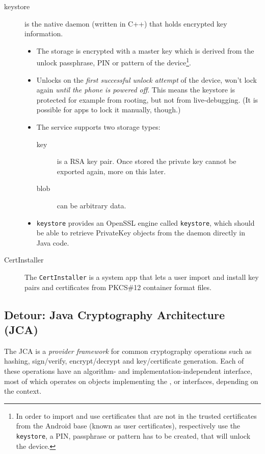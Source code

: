 \documentclass[a4paper]{scrartcl}
\begin{document}
\begin{description}
		\item[keystore] is the native daemon (written in C++) that holds encrypted key information.
			\begin{itemize}
				\item The storage is encrypted with a master key which is derived from the unlock passphrase, PIN or pattern of the device\footnote{In order to import and use certificates that are not in the trusted certificates from the Android base (known as user certificates), respectively use the \texttt{keystore}, a PIN, passphrase or pattern has to be created, that will unlock the device.}.
				\item Unlocks on the \emph{first successful unlock attempt} of the device, won't lock again \emph{until the phone is powered off}. This means the keystore is protected for example from rooting, but not from live-debugging. (It is possible for apps to lock it manually, though.)
				\item The service supports two storage types:
				\begin{description}
					\item[key] is a RSA key pair. Once stored the private key cannot be exported again, more on this later.
					\item[blob] can be arbitrary data.
				\end{description}
				\item \texttt{keystore} provides an OpenSSL engine called \texttt{keystore}, which should be able to retrieve PrivateKey objects from the daemon directly in Java code.
			\end{itemize}
		\item [CertInstaller] The \texttt{CertInstaller} is a system app that lets a user import and install key pairs and certificates from PKCS\#12 container format files. %
	\end{description}

	\subsection*{Detour: Java Cryptography Architecture (JCA)}
		The JCA is a {\em provider framework} for common cryptography operations such as hashing, sign/verify, encrypt/decrypt and key/certificate generation. Each of these operations have an algorithm- and implementation-independent interface, most of which operates on objects implementing the ,  or  interfaces, depending on the context.
\end{document}
